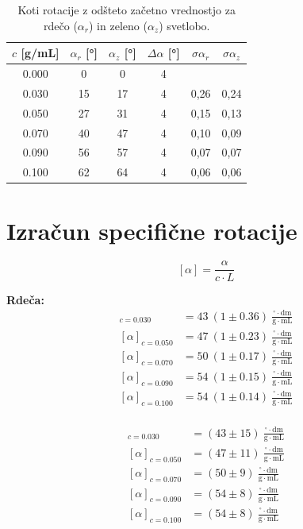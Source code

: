 \documentclass[20pt]{extarticle}
\begin{document}
\begin{table}[H]
\centering
\begin{tabular}{cccccc}
\toprule
$c$ [g/mL] & $\alpha_r$ [°] & $\alpha_z$ [°]  & $\Delta \alpha$ [°] & $\sigma \alpha_r$ & $\sigma \alpha_z$ \\
\midrule
0.000 & 0  & 0 & 4 &  \\
0.030 & 15 & 17 & 4 & 0,26 & 0,24 \\
0.050 & 27 & 31 & 4 & 0,15 & 0,13 \\
0.070 & 40 & 47 & 4 & 0,10 & 0,09 \\
0.090 & 56 & 57 & 4 & 0,07 & 0,07 \\
0.100 & 62 & 64 & 4 & 0,06 & 0,06 \\
\bottomrule
\end{tabular}
\caption{Koti rotacije z odšteto začetno vrednostjo za rdečo ($\alpha_r$) in zeleno ($\alpha_z$) svetlobo.}
\end{table}


\section*{Izračun specifične rotacije}
\[
[\alpha] = \frac{\alpha}{c \cdot L}
\]
\begin{minipage}{0.48\textwidth}
\textbf{Rdeča:}
\begin{align*}
[\alpha]_{c=0.030} &= 43 \ (1 \pm 0.36) \ \frac{^\circ \cdot \mathrm{dm}}{\mathrm{g} \cdot \mathrm{mL}}\\
[\alpha]_{c=0.050} &= 47 \ (1 \pm 0.23) \ \frac{^\circ \cdot \mathrm{dm}}{\mathrm{g} \cdot \mathrm{mL}}\\
[\alpha]_{c=0.070} &= 50 \ (1 \pm 0.17) \ \frac{^\circ \cdot \mathrm{dm}}{\mathrm{g} \cdot \mathrm{mL}}\\
[\alpha]_{c=0.090} &= 54 \ (1 \pm 0.15) \ \frac{^\circ \cdot \mathrm{dm}}{\mathrm{g} \cdot \mathrm{mL}}\\
[\alpha]_{c=0.100} &= 54 \ (1 \pm 0.14) \ \frac{^\circ \cdot \mathrm{dm}}{\mathrm{g} \cdot \mathrm{mL}}\\
\end{align*}
\end{minipage}
\hfill
\begin{minipage}{0.48\textwidth}

\begin{align*}
[\alpha]_{c=0.030} &= (43 \pm 15) \ \frac{^\circ \cdot \mathrm{dm}}{\mathrm{g} \cdot \mathrm{mL}} \\
[\alpha]_{c=0.050} &= (47 \pm 11) \ \frac{^\circ \cdot \mathrm{dm}}{\mathrm{g} \cdot \mathrm{mL}} \\
[\alpha]_{c=0.070} &= (50 \pm 9)  \ \frac{^\circ \cdot \mathrm{dm}}{\mathrm{g} \cdot \mathrm{mL}}\\
[\alpha]_{c=0.090} &= (54 \pm 8)  \ \frac{^\circ \cdot \mathrm{dm}}{\mathrm{g} \cdot \mathrm{mL}}\\
[\alpha]_{c=0.100} &= (54 \pm 8)  \ \frac{^\circ \cdot \mathrm{dm}}{\mathrm{g} \cdot \mathrm{mL}}\\
\end{align*}
\end{minipage}
\end{document}
